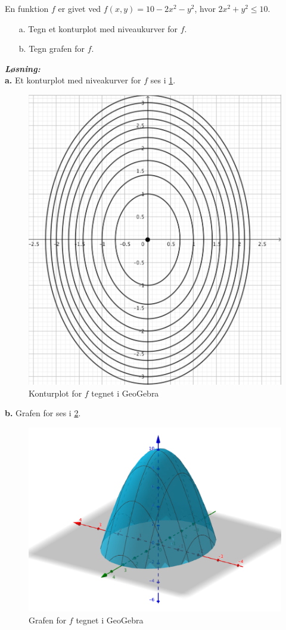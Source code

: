 \documentclass{article}
\newcommand{\sol}{\setlength{\parindent}{0cm}\textbf{\textit{Løsning:}}\setlength{\parindent}{1cm}}
\begin{document}
\begin{question}{}{}
  En funktion $f$ er givet ved 
  $f(x,y)=10-2x^2-y^2$, hvor $2x^2+y^2 \leq 10$.
\begin{itemize}
  \item[a.] Tegn et konturplot med niveaukurver for $f$.
  \item[b.] Tegn grafen for $f$.
\end{itemize}
\end{question}
\sol \\
\textbf{a.}
Et konturplot med niveakurver for $f$ ses i \cref{fig:kontur}.
\begin{figure}[H]
\begin{center}
  \includegraphics[scale=0.4]{konturplot.png }
\end{center}
\caption{Konturplot for $f$ tegnet i GeoGebra }
\label{fig:kontur}
\end{figure}
\noindent \textbf{b.}
Grafen for ses i \cref{fig:graf}.
\begin{figure}[H]
\begin{center}
  \includegraphics[scale=0.5]{graf.png}
\end{center}
\caption{Grafen for $f$ tegnet i GeoGebra}
\label{fig:graf}
\end{figure}
\end{document}
